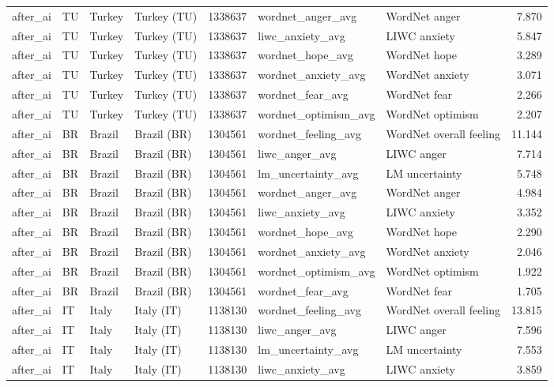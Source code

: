 \begin{tabular}{llllrllr}
after\_ai & TU & Turkey & Turkey (TU) & 1338637 & wordnet\_anger\_avg & WordNet anger & 7.870 \\
after\_ai & TU & Turkey & Turkey (TU) & 1338637 & liwc\_anxiety\_avg & LIWC anxiety & 5.847 \\
after\_ai & TU & Turkey & Turkey (TU) & 1338637 & wordnet\_hope\_avg & WordNet hope & 3.289 \\
after\_ai & TU & Turkey & Turkey (TU) & 1338637 & wordnet\_anxiety\_avg & WordNet anxiety & 3.071 \\
after\_ai & TU & Turkey & Turkey (TU) & 1338637 & wordnet\_fear\_avg & WordNet fear & 2.266 \\
after\_ai & TU & Turkey & Turkey (TU) & 1338637 & wordnet\_optimism\_avg & WordNet optimism & 2.207 \\
after\_ai & BR & Brazil & Brazil (BR) & 1304561 & wordnet\_feeling\_avg & WordNet overall feeling & 11.144 \\
after\_ai & BR & Brazil & Brazil (BR) & 1304561 & liwc\_anger\_avg & LIWC anger & 7.714 \\
after\_ai & BR & Brazil & Brazil (BR) & 1304561 & lm\_uncertainty\_avg & LM uncertainty & 5.748 \\
after\_ai & BR & Brazil & Brazil (BR) & 1304561 & wordnet\_anger\_avg & WordNet anger & 4.984 \\
after\_ai & BR & Brazil & Brazil (BR) & 1304561 & liwc\_anxiety\_avg & LIWC anxiety & 3.352 \\
after\_ai & BR & Brazil & Brazil (BR) & 1304561 & wordnet\_hope\_avg & WordNet hope & 2.290 \\
after\_ai & BR & Brazil & Brazil (BR) & 1304561 & wordnet\_anxiety\_avg & WordNet anxiety & 2.046 \\
after\_ai & BR & Brazil & Brazil (BR) & 1304561 & wordnet\_optimism\_avg & WordNet optimism & 1.922 \\
after\_ai & BR & Brazil & Brazil (BR) & 1304561 & wordnet\_fear\_avg & WordNet fear & 1.705 \\
after\_ai & IT & Italy & Italy (IT) & 1138130 & wordnet\_feeling\_avg & WordNet overall feeling & 13.815 \\
after\_ai & IT & Italy & Italy (IT) & 1138130 & liwc\_anger\_avg & LIWC anger & 7.596 \\
after\_ai & IT & Italy & Italy (IT) & 1138130 & lm\_uncertainty\_avg & LM uncertainty & 7.553 \\
after\_ai & IT & Italy & Italy (IT) & 1138130 & liwc\_anxiety\_avg & LIWC anxiety & 3.859 \\

\end{tabular}
